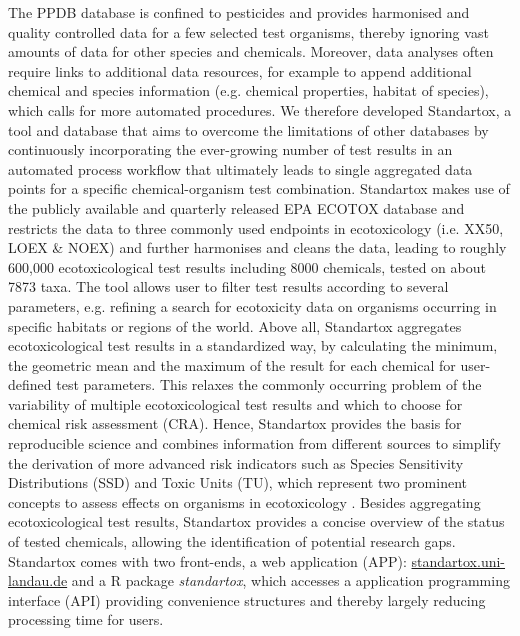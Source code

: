 The PPDB database is confined to pesticides and provides harmonised and quality controlled data for a few selected test organisms, thereby ignoring vast amounts of data for other species and chemicals. Moreover, data analyses often require links to additional data resources, for example to append additional chemical and species information (e.g. chemical properties, habitat of species), which calls for more automated procedures. We therefore developed Standartox, a tool and database that aims to overcome the limitations of other databases by continuously incorporating the ever-growing number of test results in an automated process workflow that ultimately leads to single aggregated data points for a specific chemical-organism test combination. Standartox makes use of the publicly available and quarterly released EPA ECOTOX database \citep{usepa_ecotox_2019} and restricts the data to three commonly used endpoints in ecotoxicology (i.e. XX50, LOEX \& NOEX) and further harmonises and cleans the data, leading to roughly 600,000 ecotoxicological test results including 8000 chemicals, tested on about 7873 taxa. The tool allows user to filter test results according to several parameters, e.g. refining a search for ecotoxicity data on organisms occurring in specific habitats or regions of the world. Above all, Standartox aggregates ecotoxicological test results in a standardized way, by calculating the minimum, the geometric mean and the maximum of the result for each chemical for user-defined test parameters. This relaxes the commonly occurring problem of the variability of multiple ecotoxicological test results and which to choose for chemical risk assessment (CRA). Hence, Standartox provides the basis for reproducible science and combines information from different sources to simplify the derivation of more advanced risk indicators such as Species Sensitivity Distributions (SSD) and Toxic Units (TU), which represent two prominent concepts to assess effects on organisms in ecotoxicology \citep{posthuma_species_2002, kefford_definition_2011, schafer_effects_2011}. Besides aggregating ecotoxicological test results, Standartox provides a concise overview of the status of tested chemicals, allowing the identification of potential research gaps. Standartox comes with two front-ends, a web application (APP): \url{standartox.uni-landau.de} and a R \citep{rcoreteam_language_2017} package \textit{standartox}, which accesses a application programming interface (API) providing convenience structures and thereby largely reducing processing time for users.

